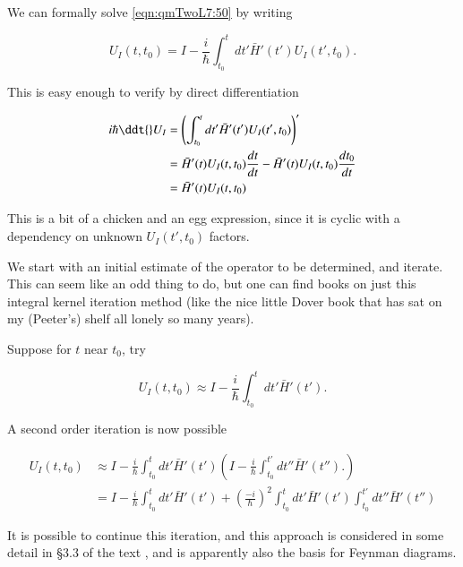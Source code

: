 We can formally solve \ref{eqn:qmTwoL7:50} by writing

\begin{equation}\label{eqn:qmTwoL7:90}
U_I(t, t_0) = I - \frac{i}{\hbar} \int_{t_0}^t dt' \bar{H}'(t') U_I(t', t_0).
\end{equation}

This is easy enough to verify by direct differentiation

\begin{align*}
i \hbar \ddt{} U_I
&=
\left(\int_{t_0}^t dt' \bar{H}'(t') U_I(t', t_0) \right)' \\
&=
\bar{H}'(t) U_I(t, t_0) \frac{dt}{dt}
-
\bar{H}'(t) U_I(t, t_0) \frac{dt_0}{dt} \\
&=
\bar{H}'(t) U_I(t, t_0)
\end{align*}

This is a bit of a chicken and an egg expression, since it is cyclic with a dependency on unknown $U_I(t', t_0)$ factors.

We start with an initial estimate of the operator to be determined, and iterate.  This can seem like an odd thing to do, but one can find books on just this integral kernel iteration method (like the nice little Dover book \cite{tricomi1985integral} that has sat on my (Peeter's) shelf all lonely so many years).

Suppose for $t$ near $t_0$, try

\begin{equation}\label{eqn:qmTwoL7:110}
U_I(t, t_0) \approx
I - \frac{i}{\hbar} \int_{t_0}^t dt' \bar{H}'(t').
\end{equation}

A second order iteration is now possible

\begin{equation}\label{eqn:qmTwoL7:130}
\begin{aligned}
U_I(t, t_0)
&\approx
I - \frac{i}{\hbar} \int_{t_0}^t dt' \bar{H}'(t') \left(
I - \frac{i}{\hbar} \int_{t_0}^{t'} dt'' \bar{H}'(t'').
\right) \\
&=
I - \frac{i}{\hbar} \int_{t_0}^t dt' \bar{H}'(t') + \left(\frac{-i}{\hbar}\right)^2
\int_{t_0}^t dt' \bar{H}'(t') \int_{t_0}^{t'} dt'' \bar{H}'(t'')
\end{aligned}
\end{equation}

It is possible to continue this iteration, and this approach is considered in some detail in \S 3.3 of the text \cite{desai2009quantum}, and is apparently also the basis for Feynman diagrams.

